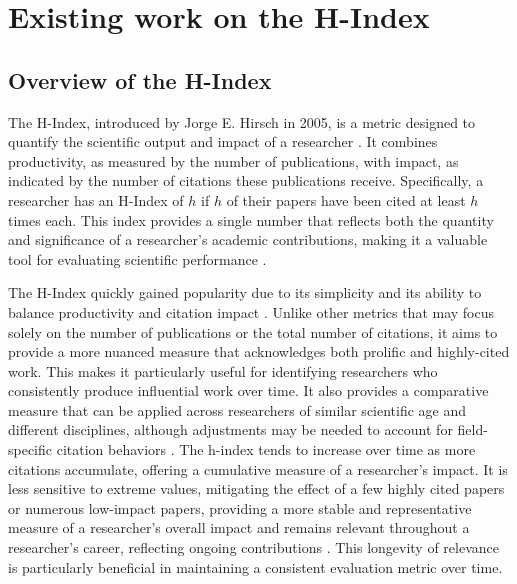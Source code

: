 \chapter{Existing work on the H-Index}
\label{ch:background}

\section{Overview of the H-Index}
The H-Index, introduced by Jorge E. Hirsch in 2005, is a metric designed to
quantify the scientific output and impact of a researcher
\cite{hirsch2005index,hirsch2014meaning,koltun2021h}. It combines productivity,
as measured by the number of publications, with impact, as indicated by the
number of citations these publications receive. Specifically, a researcher has
an H-Index of $h$ if $h$ of their papers have been cited at least $h$ times
each. This index provides a single number that reflects both the quantity and
significance of a researcher’s academic contributions, making it a valuable
tool for evaluating scientific performance
\cite{hirsch2005index,hirsch2014meaning}.

The H-Index quickly gained popularity due to its simplicity and its ability to
balance productivity and citation impact
\cite{hirsch2005index,bornmann2007what,costas2007h,waltman2012inconsistency,hirsch2014meaning,koltun2021h}.
Unlike other metrics that may focus solely on the number of publications or the
total number of citations, it aims to provide a more nuanced measure that
acknowledges both prolific and highly-cited work. This makes it particularly
useful for identifying researchers who consistently produce influential work
over time. It also provides a comparative measure that can be applied across
researchers of similar scientific age and different disciplines, although
adjustments may be needed to account for field-specific citation behaviors
\cite{hirsch2005index,bornmann2007what,costas2007h,egghe2010hirsch}. The
h-index tends to increase over time as more citations accumulate, offering a
cumulative measure of a researcher’s impact. It is less sensitive to extreme
values, mitigating the effect of a few highly cited papers or numerous
low-impact papers, providing a more stable and representative measure of a
researcher's overall impact and remains relevant throughout a researcher's
career, reflecting ongoing contributions
\cite{hirsch2005index,costas2007h,waltman2012inconsistency,egghe2010hirsch}.
This longevity of relevance is particularly beneficial in maintaining a
consistent evaluation metric over time.

